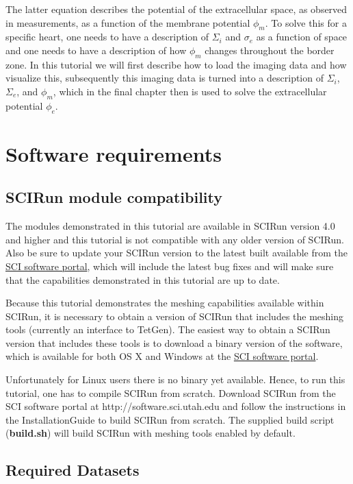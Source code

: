 \documentclass[fleqn,11pt,openany]{book}
\begin{document}
The latter equation describes the potential of the extracellular space, as observed in measurements, as a function of the membrane potential $\phi_m$. To solve this for a specific heart, one needs to have a description of $\Sigma_i$ and $\sigma_e$ as a function of space and one needs to have a description of how $\phi_m$ changes throughout the border zone. In this tutorial we will first describe how to load the imaging data and how visualize this, subsequently this imaging data is turned into a description of $\Sigma_i$, $\Sigma_e$, and $\phi_m$, which in the final chapter then is used to solve the extracellular potential $\phi_e$.

\section{Software requirements}

\subsection{SCIRun module compatibility}

The modules demonstrated in this tutorial are available in SCIRun version 4.0 and higher and this tutorial is not compatible with any older version of SCIRun. 
Also be sure to update your SCIRun version to the latest built available from the \href{http://software.sci.utah.edu}{SCI software portal}, which will include the latest bug fixes and will make sure that the capabilities demonstrated in this tutorial are up to date.

Because this tutorial demonstrates the meshing capabilities available within SCIRun, it is necessary to obtain a version of SCIRun that includes the meshing tools (currently an interface to TetGen).
The easiest way to obtain a SCIRun version that includes these tools is to download a binary version of the software, which is available for both OS X and Windows at the \href{http://software.sci.utah.edu}{SCI software portal}. 

Unfortunately for Linux users there is no binary yet available.
Hence, to run this tutorial, one has to compile SCIRun from scratch.
Download SCIRun from the SCI software portal at {http://software.sci.utah.edu } and follow the instructions in the InstallationGuide to build SCIRun from scratch. 
The supplied build script (\textbf{build.sh}) will build SCIRun with meshing tools enabled by default.

\subsection{Required Datasets}
\end{document}
